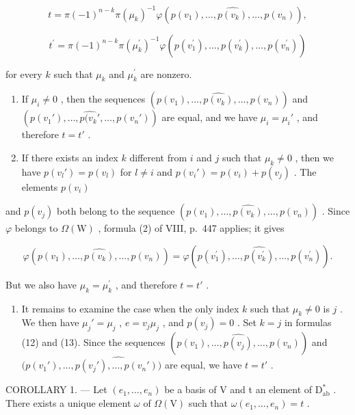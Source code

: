 \[
t = \pi (- 1) ^ {n - k} \pi (\mu_ {k}) ^ {- 1} \varphi (p (v _ {1}), \ldots , \widehat {p (v _ {k})}, \ldots , p (v _ {n})),\tag{13}
\]

\[
t ^ {\prime} = \pi (- 1) ^ {n - k} \pi (\mu_ {k} ^ {\prime}) ^ {- 1} \varphi (p (v _ {1} ^ {\prime}), \ldots , \widehat {p (v _ {k} ^ {\prime})}, \ldots , p (v _ {n} ^ {\prime}))
\]

for every \(k\) such that \(\mu_{k}\) and \(\mu_k^\prime\) are nonzero.

\begin{enumerate}
\def\labelenumi{\alph{enumi})}
\item
  If \(\mu_i \neq 0\) , then the sequences \((p(v_1), \ldots, \widehat{p(v_k)}, \ldots, p(v_n))\) and \((p(v_1'), \ldots, \widehat{p(v_k'}, \ldots, p(v_n'))\) are equal, and we have \(\mu_i = \mu_i'\) , and therefore \(t = t'\) .
\item
  If there exists an index \(k\) different from \(i\) and \(j\) such that \(\mu_k \neq 0\) , then we have \(p(v_l') = p(v_l)\) for \(l \neq i\) and \(p(v_i') = p(v_i) + p(v_j)\) . The elements \(p(v_i)\)
\end{enumerate}

and \(p(v_{j})\) both belong to the sequence \((p(v_{1}),\ldots ,\widehat{p(v_{k})},\ldots ,p(v_{n}))\) . Since \(\varphi\) belongs to \(\Omega (\mathrm{W})\) , formula (2) of VIII, p.~447 applies; it gives

\[
\varphi (p (v _ {1}), \dots , \widehat {p (v _ {k})}, \dots , p (v _ {n})) = \varphi (p (v _ {1} ^ {\prime}), \dots , \widehat {p (v _ {k} ^ {\prime})}, \dots , p (v _ {n} ^ {\prime})).
\]

But we also have \(\mu_{k} = \mu_{k}^{\prime}\) , and therefore \(t = t'\) .

\begin{enumerate}
\def\labelenumi{\alph{enumi})}
\setcounter{enumi}{2}
\tightlist
\item
  It remains to examine the case when the only index \(k\) such that \(\mu_k \neq 0\) is \(j\) . We then have \(\mu_j' = \mu_j\) , \(e = v_j\mu_j\) , and \(p(v_j) = 0\) . Set \(k = j\) in formulas (12) and (13). Since the sequences \((p(v_1), \ldots, \widehat{p(v_j)}, \ldots, p(v_n))\) and \((p(v_1'), \ldots, \widehat{p(v_j'), \ldots, p(v_n'))}\) are equal, we have \(t = t'\) .
\end{enumerate}

COROLLARY 1. --- Let \((e_1, \ldots, e_n)\) be a basis of V and t an element of \(\mathrm{D}_{\mathrm{ab}}^*\) . There exists a unique element \(\omega\) of \(\Omega(\mathrm{V})\) such that \(\omega(e_1, \ldots, e_n) = t\) .


